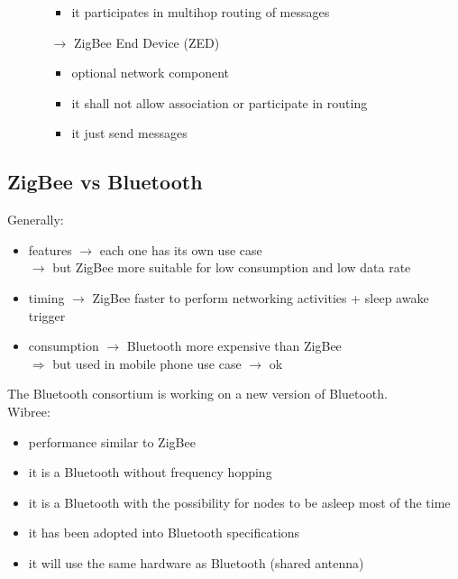 \begin{itemize}
\begin{itemize}
\begin{itemize}
            \item it participates in multihop routing of messages
        \end{itemize}
        \item[$\rightarrow$] ZigBee End Device (ZED)
        \begin{itemize}
            \item optional network component
            \item it shall not allow association or participate in routing
            \item it just send messages
        \end{itemize}  
    \end{itemize}
\end{itemize}

\subsection{ZigBee vs Bluetooth}
Generally:
\begin{itemize}
    \item features $\rightarrow$ each one has its own use case\\
    $\rightarrow$ but ZigBee more suitable for low consumption and low data rate
    \item timing $\rightarrow$ ZigBee faster to perform networking activities + sleep awake trigger
    \item consumption $\rightarrow$ Bluetooth more expensive than ZigBee\\
    $\Rightarrow$ but used in mobile phone use case $\rightarrow$ ok
\end{itemize}
The Bluetooth consortium is working on a new version of Bluetooth.\\[0.2cm]
Wibree:
\begin{itemize}
    \item performance similar to ZigBee
    \item it is a Bluetooth without frequency hopping 
    \item it is a Bluetooth with the possibility for nodes
    to be asleep most of the time
    \item it has been adopted into Bluetooth specifications
    \item it will use the same hardware as Bluetooth (shared antenna)
\end{itemize}
